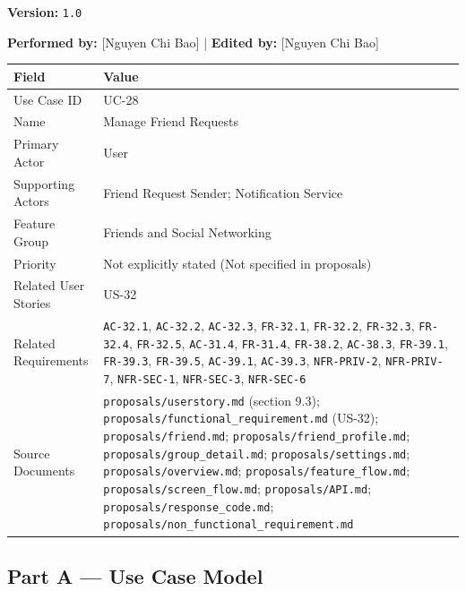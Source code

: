 \documentclass[12pt]{article}
\renewcommand{\baselinestretch}{1.5}
\begin{document}
\textbf{Version:} \texttt{1.0}
\par\medskip

\textbf{Performed by:} [Nguyen Chi Bao] | \textbf{Edited by:} [Nguyen Chi Bao]
\par\medskip

\begingroup
\small
\renewcommand{\baselinestretch}{1.0}\selectfont
\renewcommand{\arraystretch}{1.15}
\setlength{\tabcolsep}{6pt}
\begin{longtable}{|>{\raggedright\arraybackslash}p{}|>{\raggedright\arraybackslash}p{}|}
\hline
\textbf{Field} & \textbf{Value} \\ \hline
\endhead
Use Case ID & UC-28 \\ \hline
Name & Manage Friend Requests \\ \hline
Primary Actor & User \\ \hline
Supporting Actors & Friend Request Sender; Notification Service \\ \hline
Feature Group & Friends and Social Networking \\ \hline
Priority & Not explicitly stated (Not specified in proposals) \\ \hline
Related User Stories & US-32 \\ \hline
Related Requirements & \texttt{AC-32.1}, \texttt{AC-32.2}, \texttt{AC-32.3}, \texttt{FR-32.1}, \texttt{FR-32.2}, \texttt{FR-32.3}, \texttt{FR-32.4}, \texttt{FR-32.5}, \texttt{AC-31.4}, \texttt{FR-31.4}, \texttt{FR-38.2}, \texttt{AC-38.3}, \texttt{FR-39.1}, \texttt{FR-39.3}, \texttt{FR-39.5}, \texttt{AC-39.1}, \texttt{AC-39.3}, \texttt{NFR-PRIV-2}, \texttt{NFR-PRIV-7}, \texttt{NFR-SEC-1}, \texttt{NFR-SEC-3}, \texttt{NFR-SEC-6} \\ \hline
Source Documents & \texttt{proposals/userstory.md} (section 9.3); \texttt{proposals/functional\_requirement.md} (US-32); \texttt{proposals/friend.md}; \texttt{proposals/friend\_profile.md}; \texttt{proposals/group\_detail.md}; \texttt{proposals/settings.md}; \texttt{proposals/overview.md}; \texttt{proposals/feature\_flow.md}; \texttt{proposals/screen\_flow.md}; \texttt{proposals/API.md}; \texttt{proposals/response\_code.md}; \texttt{proposals/non\_functional\_requirement.md} \\ \hline
\end{longtable}
\endgroup
\par\medskip

\hypertarget{sec:part-a-use-case-model}{}
\subsection*{Part A --- Use Case Model}
\par\medskip
\end{document}
